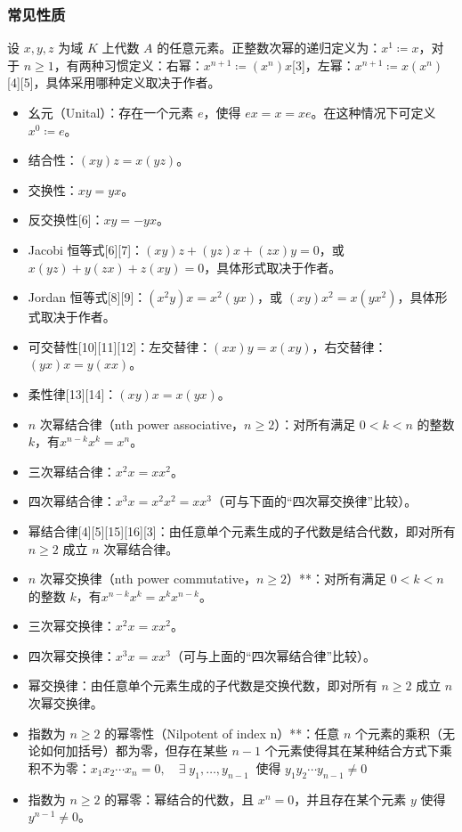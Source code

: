 \subsubsection{常见性质}
设 $x, y, z$ 为域 $K$ 上代数 $A$ 的任意元素。正整数次幂的递归定义为：$x^1 \coloneqq x$，对于 $n \geq 1$，有两种习惯定义：右幂：$x^{n+1} \coloneqq (x^n)x$[3]，左幂：$x^{n+1} \coloneqq x(x^n)$[4][5]，具体采用哪种定义取决于作者。
\begin{itemize}
\item 幺元（Unital）：存在一个元素 $e$，使得 $ex = x = xe$。在这种情况下可定义 $x^0 \coloneqq e$。
\item 结合性：$(xy)z = x(yz)$。
\item 交换性：$xy = yx$。
\item 反交换性[6]：$xy = -yx$。
\item Jacobi 恒等式[6][7]：$(xy)z + (yz)x + (zx)y = 0$，或 $x(yz) + y(zx) + z(xy) = 0$，具体形式取决于作者。
\item Jordan 恒等式[8][9]：$(x^2y)x = x^2(yx)$，或 $(xy)x^2 = x(yx^2)$，具体形式取决于作者。
\item 可交替性[10][11][12]：左交替律：$(xx)y = x(xy)$，右交替律：$(yx)x = y(xx)$。
\item 柔性律[13][14]：$(xy)x = x(yx)$。
\item $n$ 次幂结合律（nth power associative，$n \geq 2$）：对所有满足 $0 < k < n$ 的整数 $k$，有$x^{n-k}x^k = x^n$。
\item 三次幂结合律：$x^2x = xx^2$。
\item 四次幂结合律：$x^3x = x^2x^2 = xx^3$（可与下面的“四次幂交换律”比较）。
\item 幂结合律[4][5][15][16][3]：由任意单个元素生成的子代数是结合代数，即对所有 $n \geq 2$ 成立 $n$ 次幂结合律。
\item $n$ 次幂交换律（nth power commutative，$n \geq 2$）**：对所有满足 $0 < k < n$ 的整数 $k$，有$x^{n-k}x^k = x^kx^{n-k}$。
\item 三次幂交换律：$x^2x = xx^2$。
\item 四次幂交换律：$x^3x = xx^3$（可与上面的“四次幂结合律”比较）。
\item 幂交换律：由任意单个元素生成的子代数是交换代数，即对所有 $n \geq 2$ 成立 $n$ 次幂交换律。
\item 指数为 $n \geq 2$ 的幂零性（Nilpotent of index n）**：任意 $n$ 个元素的乘积（无论如何加括号）都为零，但存在某些 $n-1$ 个元素使得其在某种结合方式下乘积不为零：$x_1x_2\cdots x_n = 0, \quad \exists \; y_1,\dots,y_{n-1} \;\; \text{使得 } y_1y_2\cdots y_{n-1} \neq 0$
\item 指数为 $n \geq 2$ 的幂零：幂结合的代数，且 $x^n = 0$，并且存在某个元素 $y$ 使得 $y^{n-1} \neq 0$。
\end{itemize}